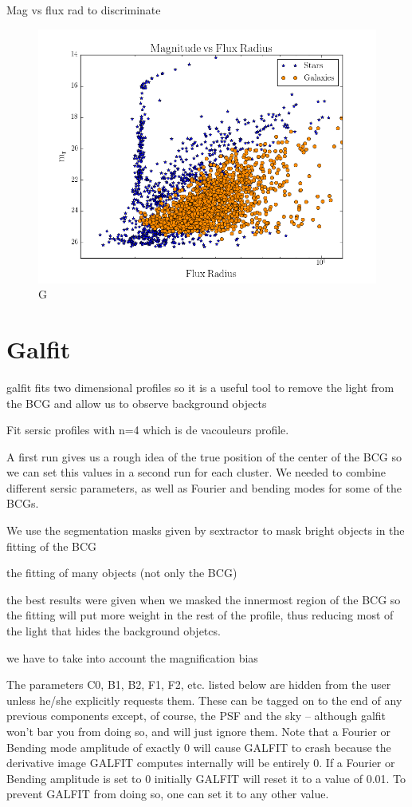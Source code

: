 Mag vs flux rad to discriminate

\begin{figure}[H]
\centering
\includegraphics[width=12cm]{images/mag vs flux rad.png}
\caption[M]{G}
\end{figure}

\section{Galfit}

galfit fits two dimensional profiles so it is a useful tool to remove the light from the BCG and allow us to observe background objects

Fit sersic profiles with n=4 which is de vacouleurs profile. 

A first run gives us a rough idea of the true position of the center of the BCG so we can set this values in a second run for each cluster. We needed to combine different sersic parameters, as well as Fourier and bending modes for some of the BCGs.

We use the segmentation masks given by sextractor to mask bright objects in the fitting of the BCG

the fitting of many objects (not only the BCG)

the best results were given when we masked the innermost region of the BCG so the fitting will put more weight in the rest of the profile, thus reducing most of the light that hides the background objetcs.

we have to take into account the magnification bias

 The parameters C0, B1, B2, F1, F2, etc. listed below are hidden 
 from the user unless he/she explicitly requests them.  These can  be tagged on to the end of any previous components except, of 
 course, the PSF and the sky -- although galfit won't bar you from doing 
 so, and will just ignore them.  Note that a Fourier or Bending mode 
 amplitude of exactly 0 will cause GALFIT to crash because the 
 derivative image GALFIT computes internally will be entirely 0.  If a 
 Fourier or Bending amplitude is set to 0 initially GALFIT will reset it  
 to a value of 0.01.  To prevent GALFIT from doing so, one can set it to any 
 other value.

